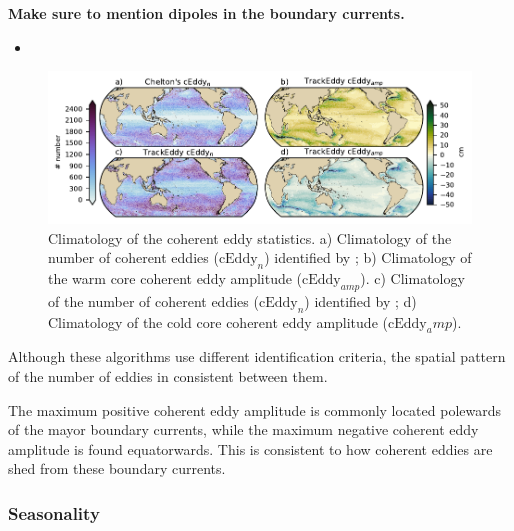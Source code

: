 \documentclass[draft,linenumbers]{agujournal2019}
\newcommand{\cEddy}{\textrm{cEddy}}
\begin{document}
	\textbf{Make sure to mention dipoles in the boundary currents.}

    \begin{itemize}
		\item 
	\end{itemize}

	\begin{figure}
	    \centering
	    \includegraphics[width=1\textwidth]{figures/global_stats_polarity.pdf}
	    \caption{Climatology of the coherent eddy statistics. a) Climatology of the number of coherent eddies ($\cEddy_n$) identified by \citet{Chelton_Global_2007}; b) Climatology of the warm core coherent eddy amplitude ($\cEddy_{amp}$). c) Climatology of the number of coherent eddies ($\cEddy_n$) identified by \citet{Martinez_Kinetic_2019}; d) Climatology of the cold core coherent eddy amplitude ($\cEddy_amp$).}
	    \label{fig:eddy_stats_climatology}
	\end{figure}

	Although these algorithms use different identification criteria, the spatial pattern of the number of eddies in consistent between them.

	The maximum positive coherent eddy amplitude is commonly located polewards of the mayor boundary currents, while the maximum negative coherent eddy amplitude is found equatorwards. This is consistent to how coherent eddies are shed from these boundary currents.

	\subsubsection{Seasonality}
\end{document}
